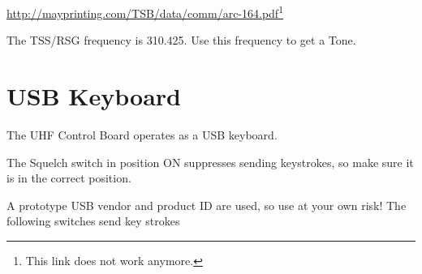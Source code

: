 \documentclass[12pt, a4paper]{report}
\begin{document}
\href{http://mayprinting.com/TSB/data/comm/arc-164.pdf}{http://mayprinting.com/TSB/data/comm/arc-164.pdf}\footnote{This link does not work anymore.}

\noindent
The TSS/RSG frequency is 310.425. Use this frequency to get a Tone.


\section{USB Keyboard}
The UHF Control Board operates as a USB keyboard.

The Squelch switch in position ON suppresses sending keystrokes, so make sure it is in the correct position.

A prototype USB vendor and product ID are used, so use at your own risk!
The following switches send key strokes
\end{document}
